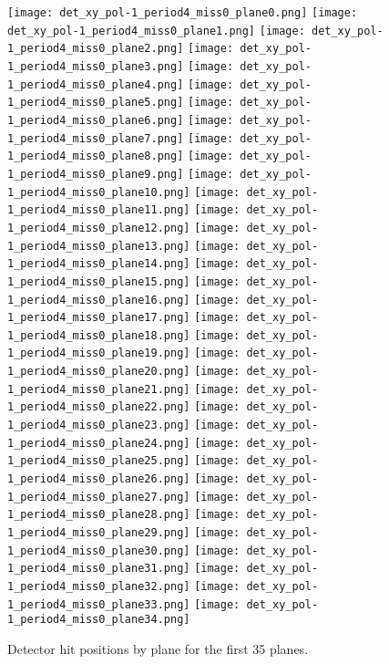       \begin{figure}[h]	   
 \centering
        	\texttt{[image: det\_xy\_pol-1\_period4\_miss0\_plane0.png]}
	 	\texttt{[image: det\_xy\_pol-1\_period4\_miss0\_plane1.png]}
		 	\texttt{[image: det\_xy\_pol-1\_period4\_miss0\_plane2.png]}
			 	\texttt{[image: det\_xy\_pol-1\_period4\_miss0\_plane3.png]}
				\texttt{[image: det\_xy\_pol-1\_period4\_miss0\_plane4.png]}	 
        	\texttt{[image: det\_xy\_pol-1\_period4\_miss0\_plane5.png]}
	 	\texttt{[image: det\_xy\_pol-1\_period4\_miss0\_plane6.png]}
		 	\texttt{[image: det\_xy\_pol-1\_period4\_miss0\_plane7.png]}
			 	\texttt{[image: det\_xy\_pol-1\_period4\_miss0\_plane8.png]}
				\texttt{[image: det\_xy\_pol-1\_period4\_miss0\_plane9.png]}					
        	\texttt{[image: det\_xy\_pol-1\_period4\_miss0\_plane10.png]}
	 	\texttt{[image: det\_xy\_pol-1\_period4\_miss0\_plane11.png]}
		 	\texttt{[image: det\_xy\_pol-1\_period4\_miss0\_plane12.png]}
			 	\texttt{[image: det\_xy\_pol-1\_period4\_miss0\_plane13.png]}
				\texttt{[image: det\_xy\_pol-1\_period4\_miss0\_plane14.png]}
        	\texttt{[image: det\_xy\_pol-1\_period4\_miss0\_plane15.png]}
	 	\texttt{[image: det\_xy\_pol-1\_period4\_miss0\_plane16.png]}
		 	\texttt{[image: det\_xy\_pol-1\_period4\_miss0\_plane17.png]}
			 	\texttt{[image: det\_xy\_pol-1\_period4\_miss0\_plane18.png]}
				\texttt{[image: det\_xy\_pol-1\_period4\_miss0\_plane19.png]}
        	\texttt{[image: det\_xy\_pol-1\_period4\_miss0\_plane20.png]}
	 	\texttt{[image: det\_xy\_pol-1\_period4\_miss0\_plane21.png]}
		 	\texttt{[image: det\_xy\_pol-1\_period4\_miss0\_plane22.png]}
			 	\texttt{[image: det\_xy\_pol-1\_period4\_miss0\_plane23.png]}
				\texttt{[image: det\_xy\_pol-1\_period4\_miss0\_plane24.png]}
        	\texttt{[image: det\_xy\_pol-1\_period4\_miss0\_plane25.png]}
	 	\texttt{[image: det\_xy\_pol-1\_period4\_miss0\_plane26.png]}
		 	\texttt{[image: det\_xy\_pol-1\_period4\_miss0\_plane27.png]}
			 	\texttt{[image: det\_xy\_pol-1\_period4\_miss0\_plane28.png]}
				\texttt{[image: det\_xy\_pol-1\_period4\_miss0\_plane29.png]}
         	\texttt{[image: det\_xy\_pol-1\_period4\_miss0\_plane30.png]}
	 	\texttt{[image: det\_xy\_pol-1\_period4\_miss0\_plane31.png]}
		 	\texttt{[image: det\_xy\_pol-1\_period4\_miss0\_plane32.png]}
			 	\texttt{[image: det\_xy\_pol-1\_period4\_miss0\_plane33.png]}
				\texttt{[image: det\_xy\_pol-1\_period4\_miss0\_plane34.png]}
   \caption[short]{Detector hit positions by plane for the first 35 planes.}
   \label{fig_dethit_first35}
  \end{figure}
  
